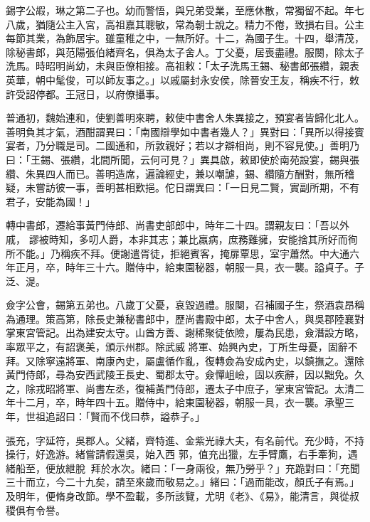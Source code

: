 \begin{pinyinscope}
 錫字公嘏，琳之第二子也。幼而警悟，與兄弟受業，至應休散，常獨留不起。年七八歲，猶隨公主入宮，高祖嘉其聰敏，常為朝士說之。精力不倦，致損右目。公主每節其業，為飾居宇。雖童稚之中，一無所好。十二，為國子生。十四，舉清茂，除秘書郎，與范陽張伯緒齊名，俱為太子舍人。丁父憂，居喪盡禮。服闋，除太子洗馬。時昭明尚幼，未與臣僚相接。高祖敕：「太子洗馬王錫、秘書郎張纘，親表英華，朝中髦俊，可以師友事之。」以戚屬封永安侯，除晉安王友，稱疾不行，敕許受詔停都。王冠日，以府僚攝事。



 普通初，魏始連和，使劉善明來聘，敕使中書舍人朱異接之，預宴者皆歸化北人。善明負其才氣，酒酣謂異曰：「南國辯學如中書者幾人？」異對曰：「異所以得接賓宴者，乃分職是司。二國通和，所敦親好；若以才辯相尚，則不容見使。」善明乃曰：「王錫、張纘，北間所聞，云何可見？」異具啟，敕即使於南苑設宴，錫與張纘、朱異四人而已。善明造席，遍論經史，兼以嘲謔，錫、纘隨方酬對，無所稽疑，未嘗訪彼一事，善明甚相歎挹。佗日謂異曰：「一日見二賢，實副所期，不有君子，安能為國！」



 轉中書郎，遷給事黃門侍郎、尚書吏部郎中，時年二十四。謂親友曰：「吾以外戚，
 謬被時知，多叨人爵，本非其志；兼比羸病，庶務難擁，安能捨其所好而徇所不能。」乃稱疾不拜。便謝遣胥徒，拒絕賓客，掩扉覃思，室宇蕭然。中大通六年正月，卒，時年三十六。贈侍中，給東園秘器，朝服一具，衣一襲。謚貞子。子泛、湜。



 僉字公會，錫第五弟也。八歲丁父憂，哀毀過禮。服闋，召補國子生，祭酒袁昂稱為通理。策高第，除長史兼秘書郎中，歷尚書殿中郎，太子中舍人，與吳郡陸襄對掌東宮管記。出為建安太守。山酋方善、謝稀聚徒依險，屢為民患，僉潛設方略，率眾平之，有詔褒美，頒示州郡。除武威
 將軍、始興內史，丁所生母憂，固辭不拜。又除寧遠將軍、南康內史，屬盧循作亂，復轉僉為安成內史，以鎮撫之。還除黃門侍郎，尋為安西武陵王長史、蜀郡太守。僉憚岨嶮，固以疾辭，因以黜免。久之，除戎昭將軍、尚書左丞，復補黃門侍郎，遷太子中庶子，掌東宮管記。太清二年十二月，卒，時年四十五。贈侍中，給東園秘器，朝服一具，衣一襲。承聖三年，世祖追詔曰：「賢而不伐曰恭，謚恭子。」



 張充，字延符，吳郡人。父緒，齊特進、金紫光祿大夫，有名前代。充少時，不持操行，好逸游。緒嘗請假還吳，始入西
 郭，值充出獵，左手臂鷹，右手牽狗，遇緒船至，便放紲脫，拜於水次。緒曰：「一身兩役，無乃勞乎？」充跪對曰：「充聞三十而立，今二十九矣，請至來歲而敬易之。」緒曰：「過而能改，顏氏子有焉。」及明年，便脩身改節。學不盈載，多所該覽，尤明《老》、《易》，能清言，與從叔稷俱有令譽。




\end{pinyinscope}
